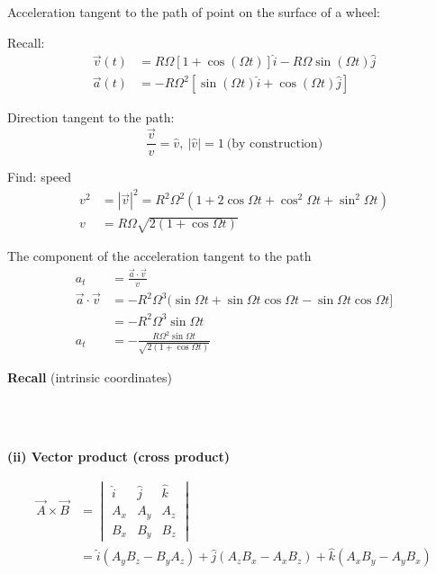 \documentclass[10pt]{scrartcl}
\begin{document}
\begin{example}
Acceleration tangent to the path of point on the surface of a wheel:

Recall:
\[
\begin{aligned}
\vec{v}(t) &= R\Omega[1 + \cos(\Omega t)]\hat{i} -R\Omega\sin(\Omega t)\hat{j}\\
\vec{a}(t) &= -R\Omega^2[\sin(\Omega t)\hat{i} + \cos(\Omega t)\hat{j}]
\end{aligned}
\]

Direction tangent to the path:
\[\frac{\vec{v}}{v} = \hat{v},~|\hat{v}| = 1\ \text{(by construction)}\]

Find: speed
\[\begin{aligned}
v^2 &= |\vec{v}|^2 = R^2\Omega^2(1 + 2\cos\Omega t + \cos^2\Omega t + \sin^2\Omega t)\\
v &= R\Omega\sqrt{2(1 + \cos\Omega t)}
\end{aligned}\]

The component of the acceleration tangent to the path 
\[\begin{aligned}
a_t &= \frac{\vec{a}\cdot\vec{v}}{v}\\
\vec{a} \cdot \vec{v} &= -R^2\Omega^3(\sin\Omega t + \sin\Omega t \cos\Omega t - \sin\Omega t \cos \Omega t]\\
&= -R^2\Omega^3\sin\Omega t\\
a_t &= -\frac{R\Omega^2\sin\Omega t}{\sqrt{2(1 + \cos\Omega t)}}
\end{aligned}
\]


\textbf{Recall} (intrinsic coordinates)

\begin{align*}
\end{align*}

\end{example}~

\textbf{(ii) Vector product (cross product)}

\[\begin{aligned}
\vec{A}\times \vec{B} &= \begin{vmatrix}
 \hat{i} & \hat{j} & \hat{k} \\
 A_x & A_y & A_z\\
 B_x & B_y & B_z	
 \end{vmatrix}\\
&= \hat{i}(A_yB_z - B_yA_z) + \hat{j}(A_zB_x - A_xB_z) + \hat{k}(A_xB_y - A_yB_x)
\end{aligned}
\]	
\end{document}
